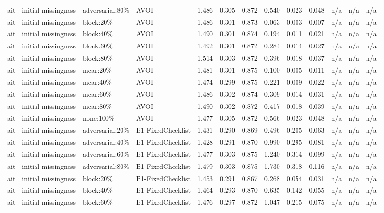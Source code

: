 \begin{table}[!ht]
{\begin{tabular}{lllllllllllll}
ait & initial missingness & adversarial:80\% & AVOI & 1.486 & 0.305 & 0.872 & 0.540 & 0.023 & 0.048 & n/a & n/a & n/a \\
ait & initial missingness & block:20\% & AVOI & 1.486 & 0.301 & 0.873 & 0.063 & 0.003 & 0.007 & n/a & n/a & n/a \\
ait & initial missingness & block:40\% & AVOI & 1.490 & 0.301 & 0.874 & 0.194 & 0.011 & 0.021 & n/a & n/a & n/a \\
ait & initial missingness & block:60\% & AVOI & 1.492 & 0.301 & 0.872 & 0.284 & 0.014 & 0.027 & n/a & n/a & n/a \\
ait & initial missingness & block:80\% & AVOI & 1.514 & 0.303 & 0.872 & 0.396 & 0.018 & 0.037 & n/a & n/a & n/a \\
ait & initial missingness & mcar:20\% & AVOI & 1.481 & 0.301 & 0.875 & 0.100 & 0.005 & 0.011 & n/a & n/a & n/a \\
ait & initial missingness & mcar:40\% & AVOI & 1.474 & 0.299 & 0.875 & 0.221 & 0.009 & 0.022 & n/a & n/a & n/a \\
ait & initial missingness & mcar:60\% & AVOI & 1.486 & 0.302 & 0.874 & 0.309 & 0.014 & 0.031 & n/a & n/a & n/a \\
ait & initial missingness & mcar:80\% & AVOI & 1.490 & 0.302 & 0.872 & 0.417 & 0.018 & 0.039 & n/a & n/a & n/a \\
ait & initial missingness & none:100\% & AVOI & 1.477 & 0.305 & 0.872 & 0.566 & 0.023 & 0.048 & n/a & n/a & n/a \\
ait & initial missingness & adversarial:20\% & B1-FixedChecklist & 1.431 & 0.290 & 0.869 & 0.496 & 0.205 & 0.063 & n/a & n/a & n/a \\
ait & initial missingness & adversarial:40\% & B1-FixedChecklist & 1.428 & 0.291 & 0.870 & 0.990 & 0.295 & 0.081 & n/a & n/a & n/a \\
ait & initial missingness & adversarial:60\% & B1-FixedChecklist & 1.477 & 0.303 & 0.875 & 1.240 & 0.314 & 0.099 & n/a & n/a & n/a \\
ait & initial missingness & adversarial:80\% & B1-FixedChecklist & 1.479 & 0.303 & 0.875 & 1.730 & 0.318 & 0.116 & n/a & n/a & n/a \\
ait & initial missingness & block:20\% & B1-FixedChecklist & 1.453 & 0.291 & 0.867 & 0.268 & 0.054 & 0.031 & n/a & n/a & n/a \\
ait & initial missingness & block:40\% & B1-FixedChecklist & 1.464 & 0.293 & 0.870 & 0.635 & 0.142 & 0.055 & n/a & n/a & n/a \\
ait & initial missingness & block:60\% & B1-FixedChecklist & 1.476 & 0.297 & 0.872 & 1.047 & 0.215 & 0.075 & n/a & n/a & n/a \\

\end{tabular}}
\end{table}
